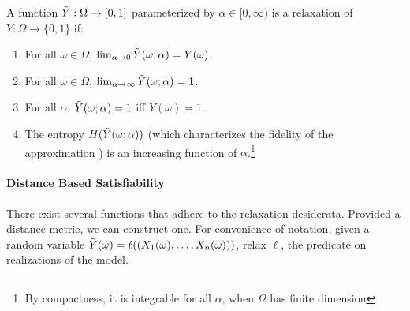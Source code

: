 

\begin{definition}
A function $\tilde{Y} : \Omega \to [0, 1]$ parameterized by $\alpha \in [0, \infty)$ is a relaxation of $Y: \Omega \to \{0, 1\}$ if:
\begin{enumerate}[label=(\roman*)]
	\label{def:temp}
	\item For all $\omega \in \Omega$, $\lim_{\alpha \to 0}\tilde{Y}(\omega; \alpha) = Y(\omega)$.
	\item For all $\omega \in \Omega$, $\lim_{\alpha \to \infty}\tilde{Y}(\omega; \alpha) = 1$.

    \item For all $\alpha$, $\tilde{Y}(\omega; \alpha) = 1$ iff $Y(\omega) = 1$.
    \item The entropy $H(\tilde{Y}(\omega; \alpha))$ (which characterizes the fidelity of the approximation ) is an increasing function of $\alpha$.\footnote
    {By compactness, it is integrable for all $\alpha$, when $\Omega$ has finite dimension}
\end{enumerate}
\end{definition}

\paragraph{Distance Based Satisfiability}
There exist several functions that adhere to the relaxation desiderata.
Provided a distance metric, we can construct one.
For convenience of notation, given a random variable $\tilde{Y}(\omega) = \ell((X_1(\omega), \dots, X_n(\omega)))$, relax $\ell$, the predicate on realizations of the model.


